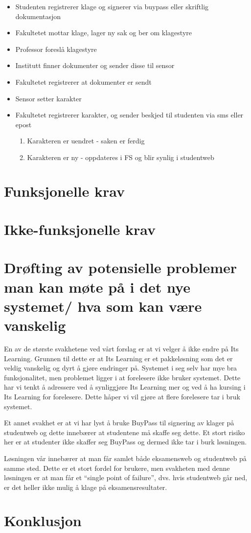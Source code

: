 \documentclass[12pt]{article}
\begin{document}
\begin{itemize}
\item Studenten registrerer klage og signerer via buypass eller skriftlig dokumentasjon
\item Fakultetet mottar klage, lager ny sak og ber om klagestyre
\item Professor foreslå klagestyre
\item Institutt finner dokumenter og sender disse til sensor
\item Fakultetet registrerer at dokumenter er sendt
\item Sensor setter karakter
\item Fakultetet registrerer karakter, og sender beskjed til studenten via sms eller epost
\begin{enumerate}
\item Karakteren er uendret - saken er ferdig
\item Karakteren er ny - oppdateres i FS og blir synlig i studentweb
\end{enumerate}
\end{itemize}


\section{Funksjonelle krav}

\section{Ikke-funksjonelle krav}

\section{Drøfting av potensielle problemer man kan møte på i det nye systemet/ hva som kan være vanskelig}
	 	
En av de største svakhetene ved vårt forslag er at vi velger å ikke endre på Its Learning. Grunnen til dette er at Its Learning er et pakkeløsning som det er veldig vanskelig og dyrt å gjøre endringer på. Systemet i seg selv har mye bra funksjonalitet, men problemet ligger i at forelesere ikke bruker systemet. Dette har vi tenkt å adressere ved å synliggjøre Its Learning mer og ved å ha kursing i Its Learning for forelesere. Dette håper vi vil gjøre at flere forelesere tar i bruk systemet.

Et annet svakhet er at vi har lyst å bruke BuyPass til signering av klager på studentweb og dette innebærer at studentene må skaffe seg dette. Et stort risiko her er at studenter ikke skaffer seg BuyPass og dermed ikke tar i burk løsningen.

Løsningen vår innebærer at man får samlet både eksamensweb og studentweb på samme sted. Dette er et stort fordel for brukere, men svakheten med denne løsningen er at man får et “single point of failure”, dvs. hvis studentweb går ned, er det heller ikke mulig å klage på eksamensresultater.

\section{Konklusjon}
\end{document}
